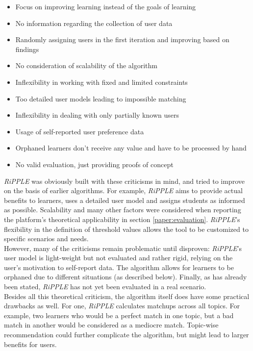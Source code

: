 \documentclass[conference]{IEEEtran}
\begin{document}
\begin{itemize}
	\item Focus on improving learning instead of the goals of learning
	\item No information regarding the collection of user data
	\item Randomly assigning users in the first iteration and improving based on findings
	\item No consideration of scalability of the algorithm
	\item Inflexibility in working with fixed and limited constraints
	\item Too detailed user models leading to impossible matching
	\item Inflexibility in dealing with only partially known users
	\item Usage of self-reported user preference data
	\item Orphaned learners don't receive any value and have to be processed by hand
	\item No valid evaluation, just providing proofs of concept
\end{itemize}
\textit{RiPPLE} was obviously built with these criticisms in mind, and tried to improve on the basis of earlier algorithms. For example, \textit{RiPPLE} aims to provide actual benefits to learners, uses a detailed user model and assigns students as informed as possible. Scalability and many other factors were considered when reporting the platform's theoretical applicability in section \ref{paper:evaluation}. \textit{RiPPLE}'s flexibility in the definition of threshold values allows the tool to be customized to specific scenarios and needs.\\ 
However, many of the criticisms remain problematic until disproven: \textit{RiPPLE}'s user model is light-weight but not evaluated and rather rigid, relying on the user's motivation to self-report data. The algorithm allows for learners to be orphaned due to different situations (as described below). Finally, as has already been stated, \textit{RiPPLE} has not yet been evaluated in a real scenario.\\
Besides all this theoretical criticism, the algorithm itself does have some practical drawbacks as well. For one, \textit{RiPPLE} calculates matchups across all topics. For example, two learners who would be a perfect match in one topic, but a bad match in another would be considered as a mediocre match. Topic-wise recommendation could further complicate the algorithm, but might lead to larger benefits for users.\\
\end{document}
